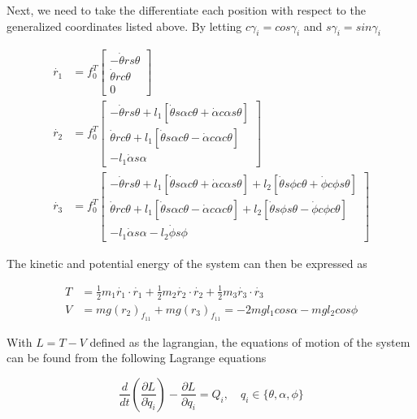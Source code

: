 \documentclass[12pt,letterpaper]{article}
\begin{document}
Next, we need to take the differentiate each position with respect to the generalized coordinates listed above. By letting $c\gamma_i = cos\gamma_i$ and $s\gamma_i = sin\gamma_i$

\begin{align*}
\Dot{r_1} &= f_0^T \begin{bmatrix}-\Dot{\theta}r s \theta \\ \Dot{\theta} r c \theta \\ 0 \end{bmatrix} \\
\Dot{r_2} &= f_0^T \begin{bmatrix}-\Dot{\theta}r s \theta + l_1 [\Dot{\theta} s \alpha c \theta + \Dot{\alpha} c \alpha s \theta]\\ \Dot{\theta} r c \theta + l_1 [\Dot{\theta} s \alpha c \theta - \Dot{\alpha} c \alpha c \theta ] \\ -l_1 \Dot{\alpha} s \alpha \end{bmatrix} \\
\Dot{r_3} &= f_0^T \begin{bmatrix}-\Dot{\theta}r s \theta + l_1 [\Dot{\theta} s \alpha c \theta + \Dot{\alpha} c \alpha s \theta] + l_2 [\Dot{\theta} s \phi c \theta + \Dot{\phi} c \phi s \theta] \\ \Dot{\theta} r c \theta + l_1 [\Dot{\theta} s \alpha c \theta - \Dot{\alpha} c \alpha c \theta ] + l_2 [\Dot{\theta} s \phi s \theta - \Dot{\phi} c \phi c \theta]\\ -l_1 \Dot{\alpha} s \alpha - l_2 \Dot{\phi} s \phi \end{bmatrix}
\end{align*}

The kinetic and potential energy of the system can then be expressed as

\begin{align*}
T &= \frac{1}{2}m_1 \Dot{r_1} \cdot \Dot{r_1} + \frac{1}{2}m_2 \Dot{r_2} \cdot \Dot{r_2} + \frac{1}{2}m_3 \Dot{r_3} \cdot \Dot{r_3} \\
V &= mg(r_2)_{f_{11}} + mg(r_3)_{f_{11}} = -2 m g l_1 cos \alpha - mg l_2 cos \phi 
\end{align*}

With $L = T - V$ defined as the lagrangian, the equations of motion of the system can be found from the following Lagrange equations

$$\frac{d}{dt}(\frac{\partial L}{\partial \Dot{q}_i}) - \frac{\partial L }{\partial q_i} = Q_i, \quad q_i \in \{\theta, \alpha, \phi\}$$
\end{document}
